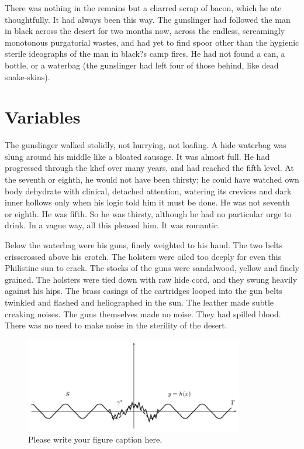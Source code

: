 \documentclass[
11pt,%
tightenlines,%
twoside,%
onecolumn,%
nofloats,%
nobibnotes,%
nofootinbib,%
superscriptaddress,%
noshowpacs,%
centertags]%
{revtex4}
\begin{document}
There was nothing in the remains but a charred scrap of bacon, which he ate thoughtfully. It had always been this way. The gunslinger had followed the man in black across the desert for two months now, across the endless, screamingly monotonous purgatorial wastes, and had yet to find spoor other than the hygienic sterile ideographs of the man in black?s camp fires. He had not found a can, a bottle, or a waterbag (the gunslinger had left four of those behind, like dead snake-skins).

\section{Variables}

The gunslinger walked stolidly, not hurrying, not loafing. A hide waterbag was slung around his middle like a bloated sausage. It was almost full. He had progressed through the khef over many years, and had reached the fifth level. At the seventh or eighth, he would not have been thirsty; he could have watched own body dehydrate with clinical, detached attention, watering its crevices and dark inner hollows only when his logic told him it must be done. He was not seventh or eighth. He was fifth. So he was thirsty, although he had no particular urge to drink. In a vague way, all this pleased him. It was romantic.

Below the waterbag were his guns, finely weighted to his hand. The two belts crisscrossed above his crotch. The holsters were oiled too deeply for even this Philistine sun to crack. The stocks of the guns were sandalwood, yellow and finely grained. The holsters were tied down with raw hide cord, and they swung heavily against his hips. The brass casings of the cartridges looped into the gun belts twinkled and flashed and heliographed in the sun. The leather made subtle creaking noises. The guns themselves made no noise. They had spilled blood. There was no need to make noise in the sterility of the desert.

\begin{figure}[h]
\setcaptionmargin{5mm}
\onelinecaptionstrue  %
\includegraphics[width=0.85\textwidth]{deform.eps}
\caption{Please write your figure caption here.}\label{fig:1}
\end{figure}
\end{document}
